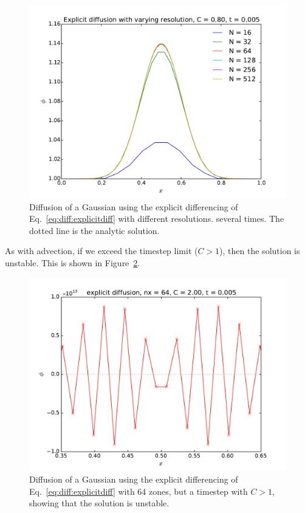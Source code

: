 \begin{figure}
\centering
\includegraphics[width=\linewidth]{diffexplicit-res}
\caption[Underresolved explicit diffusion of a Gaussian]{\label{fig:diff_explicit_res}
Diffusion of a Gaussian using the explicit differencing of
Eq.~\ref{eq:diff:explicitdiff} with different resolutions.
several times.  The dotted line is the analytic
solution.  \\ }
\end{figure}

As with advection, if we exceed the timestep limit ($C > 1$), then
the solution is unstable.  This is shown in Figure~\ref{fig:diff_explicit_bad}.

\begin{figure}
\centering
\includegraphics[width=\linewidth]{diff-explicit-64-bad}
\caption[Unstable explicit diffusion]{\label{fig:diff_explicit_bad}
Diffusion of a Gaussian using the explicit differencing of
Eq.~\ref{eq:diff:explicitdiff} with 64 zones, but a timestep
with $C > 1$, showing that the solution is unstable.
 \\ }
\end{figure}

